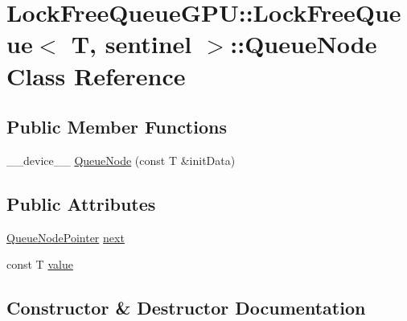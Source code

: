 \hypertarget{class_lock_free_queue_g_p_u_1_1_lock_free_queue_1_1_queue_node}{}\section{Lock\+Free\+Queue\+G\+PU\+:\+:Lock\+Free\+Queue$<$ T, sentinel $>$\+:\+:Queue\+Node Class Reference}
\label{class_lock_free_queue_g_p_u_1_1_lock_free_queue_1_1_queue_node}
\subsection*{Public Member Functions}
\begin{DoxyCompactItemize}
\item 
\+\_\+\+\_\+device\+\_\+\+\_\+ \mbox{\hyperlink{class_lock_free_queue_g_p_u_1_1_lock_free_queue_1_1_queue_node_a095b63d0a28cb181c784b61459bcfb25}{Queue\+Node}} (const T \&init\+Data)
\end{DoxyCompactItemize}
\subsection*{Public Attributes}
\begin{DoxyCompactItemize}
\item 
\mbox{\hyperlink{class_lock_free_queue_g_p_u_1_1_lock_free_queue_1_1_queue_node_pointer}{Queue\+Node\+Pointer}} \mbox{\hyperlink{class_lock_free_queue_g_p_u_1_1_lock_free_queue_1_1_queue_node_a3379b81218c1e1ec97169bf3dfa95cf6}{next}}
\item 
const T \mbox{\hyperlink{class_lock_free_queue_g_p_u_1_1_lock_free_queue_1_1_queue_node_a2cab98d8849b74f13f2241b954477435}{value}}
\end{DoxyCompactItemize}


\subsection{Constructor \& Destructor Documentation}
\mbox{\label{class_lock_free_queue_g_p_u_1_1_lock_free_queue_1_1_queue_node_a095b63d0a28cb181c784b61459bcfb25}} 
